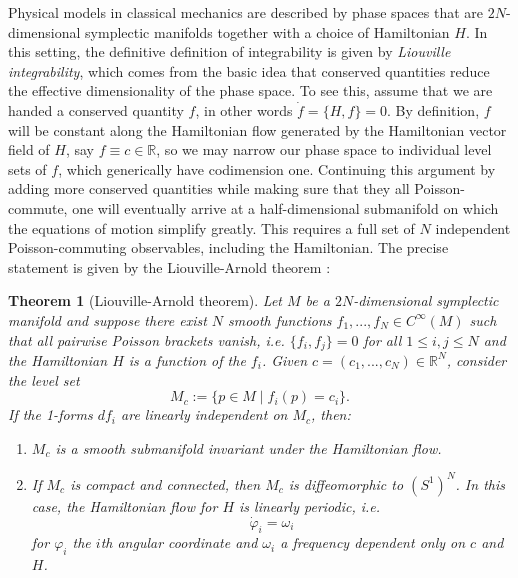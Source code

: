\documentclass[11pt]{report}
\newtheorem{theorem}{Theorem}[section]
\theoremstyle{definition}
\theoremstyle{remark}
\theoremstyle{remark}
\newcommand{\R}{\mathbb{R}}
\begin{document}
Physical models in classical mechanics are described by phase spaces that are $2N$-dimensional symplectic manifolds together with a choice of Hamiltonian $H$. In this setting, the definitive definition of integrability is given by \emph{Liouville integrability}, which comes from the basic idea that conserved quantities reduce the effective dimensionality of the phase space. To see this, assume that we are handed a conserved quantity $f$, in other words $\dot f = \{ H, f \} = 0$. By definition, $f$ will be constant along the Hamiltonian flow generated by the Hamiltonian vector field of $H$, say $f \equiv c \in \R$, so we may narrow our phase space to individual level sets of $f$, which generically have codimension one. Continuing this argument by adding more conserved quantities while making sure that they all Poisson-commute, one will eventually arrive at a half-dimensional submanifold on which the equations of motion simplify greatly. This requires a full set of $N$ independent Poisson-commuting observables, including the Hamiltonian. The precise statement is given by the Liouville-Arnold theorem \cite{book:arnold}:

\begin{theorem}[Liouville-Arnold theorem]
Let $M$ be a $2N$-dimensional symplectic manifold and suppose there exist $N$ smooth functions $f_1,...,f_N \in C^\infty(M)$ such that all pairwise Poisson brackets vanish, \emph{i.e.} $\{ f_i,f_j \} = 0$ for all $1 \leq i,j \leq N$ and the Hamiltonian $H$ is a function of the $f_i$. Given $c = (c_1,...,c_N) \in \R^N$, consider the level set
\begin{equation*}
M_c := \{ p \in M \mid f_i(p) = c_i \}.
\end{equation*}
If the 1-forms $df_i$ are linearly independent on $M_c$, then:
\begin{enumerate}[label=(\roman*)]
\item $M_c$ is a smooth submanifold invariant under the Hamiltonian flow.
\item If $M_c$ is compact and connected, then $M_c$ is diffeomorphic to $(S^1)^N$. In this case, the Hamiltonian flow for $H$ is linearly periodic, \emph{i.e.}
\begin{equation*}
\dot \varphi_i = \omega_i
\end{equation*}
for $\varphi_i$ the $i$th angular coordinate and $\omega_i$ a frequency dependent only on $c$ and $H$.
\end{enumerate}
\end{theorem}
\end{document}
